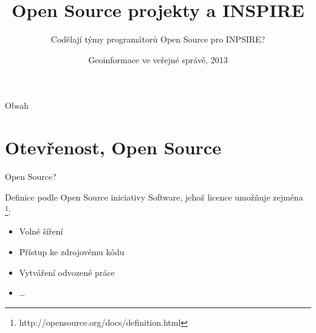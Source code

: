\documentclass{beamer}
\title[Open Source] %
{Open Source projekty a INSPIRE}
\subtitle {Codělají týmy programátorů Open Source pro INPSIRE?}
\author[J. Čepický] %
\institute %
{
  \inst{1}%
  Help Service - Remote Sensing s.r.o. \\
  Benešov\\
  \url{http://hsrs.cz}
}
\date[27.5.2013-28.5.2013] %
{Geoinformace ve veřejné správě, 2013}
\begin{document}
\begin{frame}
  \titlepage
\end{frame}

\begin{frame}{Obsah}
  \tableofcontents
\end{frame}





\section{Otevřenost, Open Source}

\begin{frame}{Open Source?}

\begin{block}{Definice podle Open Source iniciativy}
    Software, jehož licence umožňuje zejména \footnote{http://opensource.org/docs/definition.html}:
    \begin{itemize} 
        \item Volné šíření
        \item Přístup ke zdrojovému kódu
        \item Vytváření odvozené práce
        \item \dots
    \end{itemize}
\end{block}
\end{frame}
\end{document}
